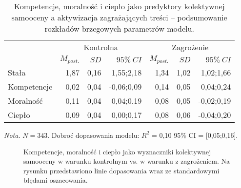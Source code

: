 \documentclass[man]{apa6}
\begin{document}
\begin{table*}[htbp]
\vspace*{2em}
\centering
\begin{threeparttable}
\caption{Kompetencje, moralność i ciepło jako predyktory kolektywnej samooceny a aktywizacja zagrażających treści -- podsumowanie rozkładów brzegowych parametrów modelu.}
\label{tab:4}
\begin{tabular}{lrrrrrr}

\midrule
 &
\multicolumn{3}{c}{Kontrolna} &
\multicolumn{3}{c}{Zagrożenie} \\
\cline{2-7}
 & $M_{post.}$    & $SD$   & $95\%\ CI$   & $M_{post.}$    & $SD$   & $95\%\ CI$  \\
\midrule
 Stała       &  1,87 & 0,16 &  1,55;2,18 &  1,34 & 1,02 &  1,02;1,66 \\
 Kompetencje &  0,02 & 0,04 & -0,06;0,09 &  0,14 & 0,05 &  0,04;0,24 \\
 Moralność   &  0,11 & 0,04 &  0,04;0.19 &  0,08 & 0,05 & -0,02;0,19 \\
 Ciepło      &  0,09 & 0,04 &  0,00;0,17 &  0,08 & 0,06 & -0,04;0,20 \\
\bottomrule
\end{tabular}
\begin{tablenotes}
{\small
\textit{Nota.} $N = 343$. Dobroć dopasowania modelu: $R^2$ = 0,10 95\% CI = [0,05;0,16].
}
\end{tablenotes}
\end{threeparttable}
\end{table*}

\begin{figure*}[htbp]
   \centering
   \caption{Kompetencje, moralność i ciepło jako wyznaczniki kolektywnej samooceny w warunku kontrolnym vs. w warunku z zagrożeniem. Na rysunku przedstawiono linie dopasowania wraz ze standardowymi błędami oszacowania.}
   \label{fig:study4}
\end{figure*}
\end{document}
